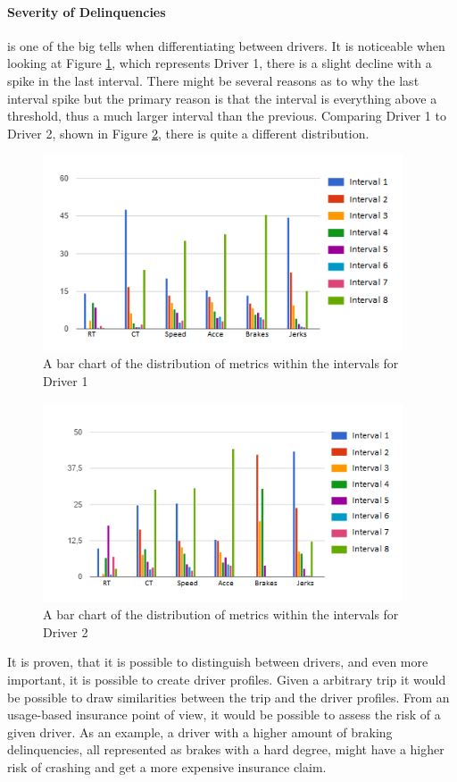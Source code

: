 \paragraph{Severity of Delinquencies} is one of the big tells when differentiating between drivers. It is noticeable when looking at Figure \ref{fig:car8intervals}, which represents Driver 1, there is a slight decline with a spike in the last interval. There might be several reasons as to why the last interval spike but the primary reason is that the interval is everything above a threshold, thus a much larger interval than the previous. Comparing Driver 1 to Driver 2, shown in Figure \ref{fig:car21intervals}, there is quite a different distribution.

\begin{figure}[tb]
\centering
\includegraphics[width=0.95\textwidth]{Pictures/car8intervals}
\caption{A bar chart of the distribution of metrics within the intervals for Driver 1}
\label{fig:car8intervals}
\end{figure}

\begin{figure}[tb]
\centering
\includegraphics[width=0.95\textwidth]{Pictures/car21intervals}
\caption{A bar chart of the distribution of metrics within the intervals for Driver 2}
\label{fig:car21intervals}
\end{figure}

It is proven, that it is possible to distinguish between drivers, and even more important, it is possible to create driver profiles. Given a arbitrary trip it would be possible to draw similarities between the trip and the driver profiles. From an usage-based insurance point of view, it would be possible to assess the risk of a given driver. As an example, a driver with a higher amount of braking delinquencies, all represented as brakes with a hard degree, might have a higher risk of crashing and get a more expensive insurance claim.
